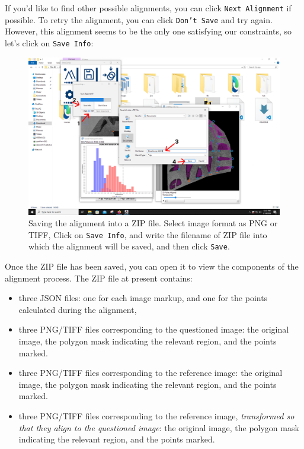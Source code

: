 \documentclass{csafedoc}
\begin{document}
If you'd like to find other possible alignments, you can click \texttt{Next Alignment} if
possible. To retry the alignment, you can click \texttt{Don't Save} and try again.
However, this alignment seems to be the only one satisfying our constraints, so let's
click on \texttt{Save Info}:

\begin{figure}[H]
	\begin{center}
		\includegraphics[width=0.8\linewidth]{images/step_8d-anno.png}
	\end{center}
	\caption{Saving the alignment into a ZIP file. Select image format as PNG or TIFF, Click on \texttt{Save Info}, and write the filename of ZIP file into which the alignment will be saved, and then click \texttt{Save}.}
	\label{fig:step8d}
\end{figure}

Once the ZIP file has been saved, you can open it to view the components of the alignment
process. The ZIP file at present contains:

\begin{itemize}
	\item three JSON files: one for each image markup, and one for the points calculated
	      during the alignment,
	\item three PNG/TIFF files corresponding to the questioned image: the original image, the
	      polygon mask indicating the relevant region, and the points marked.
	\item three PNG/TIFF files corresponding to the reference image: the original image, the
	      polygon mask indicating the relevant region, and the points marked.
	\item three PNG/TIFF files corresponding to the reference image, \textit{transformed so
		      that they align to the questioned image}: the original image, the
	      polygon mask indicating the relevant region, and the points marked.
\end{itemize}
\end{document}
